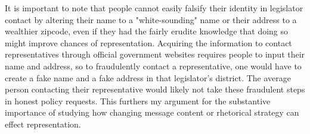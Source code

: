 \documentclass[12pt]{article}\usepackage[]{graphicx}\usepackage[]{color}
\begin{document}
 It is important to note that people cannot easily falsify their identity in legislator contact by altering their name to a "white-sounding" name or their address to a wealthier zipcode, even if they had the fairly erudite knowledge that doing so might improve chances of representation. Acquiring the information to contact representatives through official government websites requires people to input their name and address, so to fraudulently contact a representative, one would have to create a fake name and a fake address in that legislator's district. The average person contacting their representative would likely not take these fraudulent steps in honest policy requests. This furthers my argument for the substantive importance of studying how changing message content or rhetorical strategy can effect representation.

\end{document}
